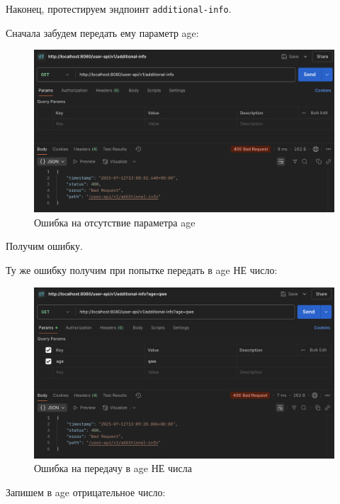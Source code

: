 \documentclass[a4paper, 14pt]{article}
\begin{document}
Наконец, протестируем эндпоинт \texttt{additional-info}.

Сначала забудем передать ему параметр age:

\begin{figure}[H]
	\centering
	\includegraphics[width=15cm]{resources/9.png}
	\caption{Ошибка на отсутствие параметра age}
\end{figure}

Получим ошибку.

Ту же ошибку получим при попытке передать в age НЕ число:

\begin{figure}[H]
	\centering
	\includegraphics[width=15cm]{resources/10.png}
	\caption{Ошибка на передачу в age НЕ числа}
\end{figure}

Запишем в age отрицательное число:
\end{document}
